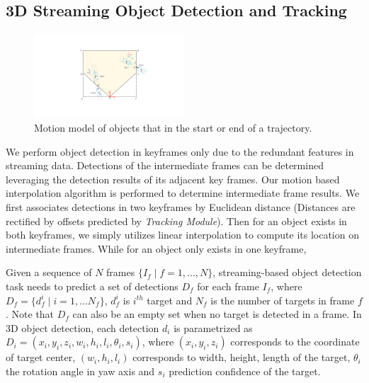 \documentclass[letterpaper, 10 pt, conference]{ieeeconf}  %
\begin{document}
\subsection{3D Streaming Object Detection and Tracking}
\begin{figure}
	\vspace{-0.6cm}
	\rule{0pt}{1ex}
	\begin{center}
		\includegraphics[trim={10cm, 4cm, 8cm, 3.5cm}, clip, width=0.5\textwidth]{images/motion.pdf}
	\end{center}
	\caption{Motion model of objects that in the start or end of a trajectory.}
	\label{fig:motion}
	\vspace{-0.5cm}
\end{figure}

We perform object detection in keyframes only due to the redundant features in streaming data. Detections of the intermediate frames can be determined leveraging the detection results of its adjacent key frames. Our motion based interpolation algorithm is performed to determine intermediate frame results. We first associates detections in two keyframes by Euclidean distance (Distances are rectified by offsets predicted by \textit{Tracking Module}). Then for an object exists in both keyframes, we simply utilizes linear interpolation to compute its location on intermediate frames. While for an object only exists in one keyframe, 


Given a sequence of $N$ frames $\{I_f \mid f = 1, ..., N\}$, streaming-based object detection task needs to predict a set of detections $D_f$ for each frame $I_f$, where $D_f = \{d^i_f \mid i = 1,...N_f\}$, $d^i_f$ is $i^{th}$ target and $N_f$ is the number of targets in frame $f$. Note that $D_f$ can also be an empty set when no target is detected in a frame. In 3D object detection, each detection $d_i$ is parametrized as $D_i = (x_i, y_i, z_i, w_i, h_i, l_i, \theta_i, s_i)$, where $(x_i, y_i, z_i)$ corresponds to the coordinate of target center, $(w_i, h_i, l_i)$ corresponds to width, height, length of the target, $\theta_i$ the rotation angle in yaw axis and $s_i$ prediction confidence of the target.
\end{document}
